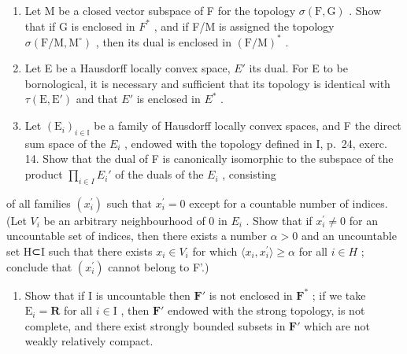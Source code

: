 \begin{enumerate}
\def\labelenumi{\alph{enumi})}
\tightlist
\item
  Let M be a closed vector subspace of F for the topology \(\sigma(\mathrm{F},\mathrm{G})\) . Show that if G is enclosed in \(F^{*}\) , and if F/M is assigned the topology \(\sigma(\mathrm{F}/\mathrm{M},\mathrm{M}^{\circ})\) , then its dual is enclosed in \((\mathrm{F}/\mathrm{M})^{*}\) .
\item
  Let E be a Hausdorff locally convex space, \(E'\) its dual. For E to be bornological, it is necessary and sufficient that its topology is identical with \(\tau(\mathrm{E},\mathrm{E}')\) and that \(E'\) is enclosed in \(E^{*}\) .
\item
  Let \((\mathrm{E}_{i})_{i\in\mathbb{I}}\) be a family of Hausdorff locally convex spaces, and F the direct sum space of the \(E_{i}\) , endowed with the topology defined in I, p.~24, exerc. 14. Show that the dual of F is canonically isomorphic to the subspace of the product \(\prod_{i\in I}E_{i}'\) of the duals of the \(E_{i}\) , consisting
\end{enumerate}

of all families \((x_{i}^{\prime})\) such that \(x_{i}^{\prime}=0\) except for a countable number of indices. (Let \(V_{i}\) be an arbitrary neighbourhood of 0 in \(E_{i}\) . Show that if \(x_{i}^{\prime}\neq0\) for an uncountable set of indices, then there exists a number \(\alpha>0\) and an uncountable set H⊂I such that there exists \(x_{i}\in V_{i}\) for which \(\langle x_{i},x_{i}^{\prime}\rangle\geqslant\alpha\) for all \(i\in H\) ; conclude that \((x_{i}^{\prime})\) cannot belong to F'.)

\begin{enumerate}
\def\labelenumi{\alph{enumi})}
\setcounter{enumi}{3}
\tightlist
\item
  Show that if I is uncountable then \(\mathbf{F}'\) is not enclosed in \(\mathbf{F}^*\) ; if we take \(\mathrm{E}_i = \mathbf{R}\) for all \(i \in \mathrm{I}\) , then \(\mathbf{F}'\) endowed with the strong topology, is not complete, and there exist strongly bounded subsets in \(\mathbf{F}'\) which are not weakly relatively compact.
\end{enumerate}

